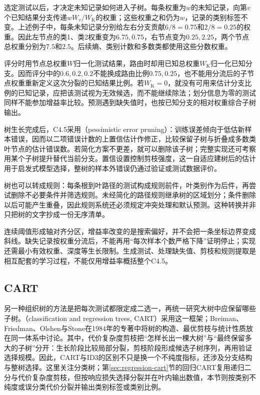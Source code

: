 选定测试以后，才决定未知记录如何进入子树。每条权重为$w$的未知记录，向第$v$个已知结果分支传递$wW_v/W_{\mathrm K}$的权重；这些权重之和仍为$w$，记录的类别标签不变。上述例子中，每条未知记录分别给左右分支贡献$6/8=0.75$和$2/8=0.25$的权重。因此左节点的类1、类2权重变为$6.75,0.75$，右节点变为$0.25,2.25$，两个节点总权重分别为$7.5$和$2.5$。后续熵、类别计数和多数类都使用这些分数权重。

评分时用节点总权重$W$归一化测试结果，路由时却用已知总权重$W_{\mathrm K}$归一化已知分支。因而评分中的$0.6,0.2,0.2$不能换成路由比例$0.75,0.25$，也不能用分流后的子节点权重重新定义这次分裂的已知结果比例。若$W_{\mathrm K}=0$，就没有可用来估计分支比例的已知记录，应把该测试视为无效候选，而不能继续除法；划分信息为零的测试同样不能参加增益率比较。预测遇到缺失值时，也按已知分支的相对权重综合子树输出。

树生长完成后，C4.5采用（pessimistic error pruning）：训练误差倾向于低估新样本错误，因而以二项错误计数的上置信估计作修正，比较保留子树与折叠成多数类叶节点的估计错误数。若简化方案不更差，就可以删除该子树；完整实现还可考察用某个子树提升替代当前分支。置信设置控制剪枝强度，这一自适应建树后的估计用于启发式模型选择，整树的样本外错误仍通过验证或测试数据评价。

树也可以转成规则：每条根到叶路径的测试构成规则前件，叶类别作为后件，再尝试删除不必要条件并筛选规则。未经简化的路径规则继承树的区域划分；条件删除以后可能产生重叠，因此规则系统还必须规定冲突处理和默认预测。这种转换并非只把树的文字抄成一份无序清单。

连续阈值形成轴对齐分区，增益率改变的是搜索偏好，并不会把一条坐标边界变成斜线。缺失记录按权重分流后，不能再用“每次样本个数严格下降”证明停止；实现还需最小有效权重、深度等生长限制。生成测试、处理缺失值、剪枝和规则提取是相互配套的学习过程，不能仅用增益率概括整个C4.5。

\subsection{CART}
\label{sec:classification-cart}

另一种组织树的方法是把每次测试都限定成二选一，再统一研究大树中应保留哪些子树。（classification and regression trees, CART）采用这一框架；Breiman、Friedman、Olshen与Stone在1984年的专著中将树的构造、最优剪枝与统计性质放在同一体系中讨论。其中，代价复杂度剪枝把“怎样长出一棵大树”与“最终保留多大的子树”分开：生长阶段比较局部分裂，剪枝阶段形成候选子树序列，再用验证选择规模。因此，CART与ID3的区别不只是换一个不纯度指标，还涉及分支结构与整树选择。这里关注分类树；第\ref{sec:regression-cart}节的回归CART复用递归二分与代价复杂度剪枝，但按响应损失选择分裂并在叶内输出数值，本节则按类别不纯度或误分类代价分裂并输出类别标签或类别比例。

